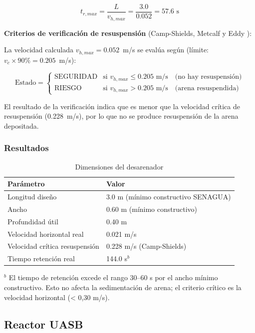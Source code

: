 \documentclass[12pt,a4paper]{article}
\begin{document}
\begin{equation}
t_{r,max} = \frac{L}{v_{h,max}} = \frac{3.0}{0.052} = 57.6 \text{ s}
\end{equation}

\textbf{Criterios de verificación de resuspensión} (Camp-Shields, Metcalf y Eddy \cite{metcalf2014}):

La velocidad calculada $v_{h,max} = 0.052$~m/s se evalúa según (límite: $v_c \times 90\% = 0.205$~m/s):

\begin{equation}
\text{Estado} = \begin{cases}
    \text{SEGURIDAD} & \text{si } v_{h,max} \leq 0.205 \text{ m/s} \quad \text{(no hay resuspensión)} \\
    \text{RIESGO} & \text{si } v_{h,max} > 0.205 \text{ m/s} \quad \text{(arena resuspendida)}
\end{cases}
\end{equation}

El resultado de la verificación indica que es menor que la velocidad crítica de resuspensión (0.228~m/s), por lo que no se produce resuspensión de la arena depositada.

\subsubsection{Resultados}

\begin{table}[H]
\centering
\caption{Dimensiones del desarenador}
\begin{tabular}{ll}
\toprule
Parámetro & Valor \\
\midrule
Longitud diseño & 3.0 m (mínimo constructivo SENAGUA) \\
Ancho & 0.60 m (mínimo constructivo) \\
Profundidad útil & 0.40 m \\
Velocidad horizontal real & 0.021 m/s \\
Velocidad crítica resuspensión & 0.228 m/s (Camp-Shields) \\
Tiempo retención real & 144.0 s$^b$ \\
\bottomrule
\end{tabular}
\small
$^b$ El tiempo de retención excede el rango 30--60 s por el ancho mínimo constructivo. Esto no afecta la sedimentación de arena; el criterio crítico es la velocidad horizontal (< 0,30 m/s).
\end{table}

\subsection{Reactor UASB}
\end{document}
